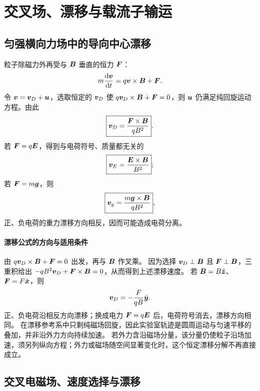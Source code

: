 {\section{交叉场、漂移与载流子输运}

\subsection{匀强横向力场中的导向中心漂移}


粒子除磁力外再受与 $\bm{B}$ 垂直的恒力 $\bm{F}$：
\begin{equation}
  m\frac{\mathop{}\!\mathrm d\bm{v}}{\mathop{}\!\mathrm d t}=q\bm{v}\times\bm{B}+\bm{F}.
\end{equation}
令 $\bm{v}=\bm{v}_D+\bm{u}$，选取恒定的 $\bm{v}_D$ 使
$q\bm{v}_D\times\bm{B}+\bm{F}=0$，则 $\bm{u}$ 仍满足纯回旋运动方程。由此
\begin{equation}
  \boxed{\bm{v}_D=\frac{\bm{F}\times\bm{B}}{qB^2}}.
\end{equation}
若 $\bm{F}=q\bm{E}$，得到与电荷符号、质量都无关的
\begin{equation}
  \boxed{\bm{v}_E=\frac{\bm{E}\times\bm{B}}{B^2}};
\end{equation}
若 $\bm{F}=m\bm{g}$，则
\begin{equation}
  \boxed{\bm{v}_g=\frac{m\bm{g}\times\bm{B}}{qB^2}},
\end{equation}
正、负电荷的重力漂移方向相反，因而可能造成电荷分离。

\driftDiagram



\paragraph{漂移公式的方向与适用条件}
由 $q\bm{v}_D\times\bm{B}+\bm{F}=0$ 出发，再与 $\bm{B}$ 作叉乘。
因为选择 $\bm{v}_D\perp\bm{B}$ 且 $\bm{F}\perp\bm{B}$，三重积给出
$-qB^2\bm{v}_D+\bm{F}\times\bm{B}=0$，从而得到上述漂移速度。
若 $\bm{B}=B\hat{\bm{z}}$、$\bm{F}=F\hat{\bm{x}}$，则
\[
 \bm{v}_D=-\frac{F}{qB}\hat{\bm{y}}.
\]
正、负电荷沿相反方向漂移；换成电力 $\bm{F}=q\bm{E}$ 后，电荷符号消去，漂移方向相同。
在漂移参考系中只剩纯磁场回旋，因此实验室轨迹是圆周运动与匀速平移的叠加，并非沿外力方向持续加速。
若外力含沿磁场分量，该分量仍使粒子沿场加速，须另列纵向方程；外力或磁场随空间显著变化时，这个恒定漂移分解不再直接成立。


\subsection{交叉电磁场、速度选择与漂移}


}

